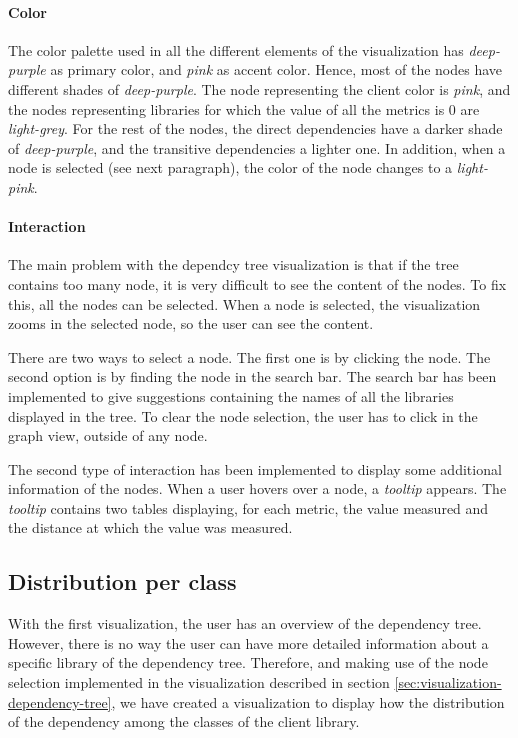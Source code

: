 \paragraph{Color}
The color palette used in all the different elements of the visualization has \textit{deep-purple} as primary color, and \textit{pink} as accent color. Hence, most of the nodes have different shades of \textit{deep-purple}. The node representing the client color is \textit{pink}, and the nodes representing libraries for which the value of all the metrics is 0 are \textit{light-grey}. For the rest of the nodes, the direct dependencies have a darker shade of \textit{deep-purple}, and the transitive dependencies a lighter one. 
In addition, when a node is selected (see next paragraph), the color of the node changes to a \textit{light-pink}.

\paragraph{Interaction}
The main problem with the dependcy tree visualization is that if the tree contains too many node, it is very difficult to see the content of the nodes. To fix this, all the nodes can be selected. When a node is selected, the visualization zooms in the selected node, so the user can see the content.

There are two ways to select a node. The first one is by clicking the node. The second option is by finding the node in the search bar. The search bar has been implemented to give suggestions containing the names of all the libraries displayed in the tree. To clear the node selection, the user has to click in the graph view, outside of any node.

The second type of interaction has been implemented to display some additional information of the nodes. When a user hovers over a node, a \textit{tooltip} appears. The \textit{tooltip} contains two tables displaying, for each metric, the value measured and the distance at which the value was measured.

\subsection{Distribution per class}
With the first visualization, the user has an overview of the dependency tree. However, there is no way the user can have more detailed information about a specific library of the dependency tree. Therefore, and making use of the node selection implemented in the visualization described in section \ref{sec:visualization-dependency-tree}, we have created a visualization to display how the distribution of the dependency among the classes of the client library.

